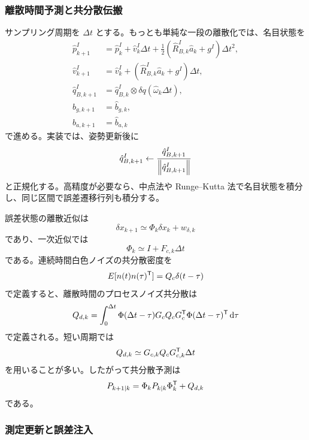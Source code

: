 \subsubsection{離散時間予測と共分散伝搬}

サンプリング周期を $\Delta t$ とする。もっとも単純な一段の離散化では、名目状態を
\begin{align}
  \hat{p}^I_{k+1}
  &=
  \hat{p}^I_k+\hat{v}^I_k\Delta t
  +\frac{1}{2}(\hat{R}^I_{B,k}\hat{a}_k+g^I)\Delta t^2,\\
  \hat{v}^I_{k+1}
  &=
  \hat{v}^I_k+(\hat{R}^I_{B,k}\hat{a}_k+g^I)\Delta t,\\
  \hat{q}^I_{B,k+1}
  &=
  \hat{q}^I_{B,k}\otimes\delta q(\hat{\omega}_k\Delta t),\\
  \hat{b}_{g,k+1}&=\hat{b}_{g,k},\\
  \hat{b}_{a,k+1}&=\hat{b}_{a,k}
\end{align}
で進める。実装では、姿勢更新後に
\begin{equation}
  \hat{q}^I_{B,k+1}
  \leftarrow
  \frac{\hat{q}^I_{B,k+1}}{\left\|\hat{q}^I_{B,k+1}\right\|}
\end{equation}
と正規化する。高精度が必要なら、中点法や Runge--Kutta 法で名目状態を積分し、同じ区間で誤差遷移行列も積分する。

誤差状態の離散近似は
\begin{equation}
  \delta x_{k+1}
  \simeq
  \Phi_k\delta x_k+w_{\delta,k}
\end{equation}
であり、一次近似では
\begin{equation}
  \Phi_k\simeq I+F_{c,k}\Delta t
\end{equation}
である。連続時間白色ノイズの共分散密度を
\begin{equation}
  E[n(t)n(\tau)^{\mathsf{T}}]=Q_c\delta(t-\tau)
\end{equation}
で定義すると、離散時間のプロセスノイズ共分散は
\begin{equation}
  Q_{d,k}
  =
  \int_0^{\Delta t}
  \Phi(\Delta t-\tau)G_cQ_cG_c^{\mathsf{T}}
  \Phi(\Delta t-\tau)^{\mathsf{T}}\,\mathrm{d}\tau
\end{equation}
で定義される。短い周期では
\begin{equation}
  Q_{d,k}\simeq G_{c,k}Q_cG_{c,k}^{\mathsf{T}}\Delta t
\end{equation}
を用いることが多い。したがって共分散予測は
\begin{equation}
  P_{k+1|k}
  =
  \Phi_kP_{k|k}\Phi_k^{\mathsf{T}}+Q_{d,k}
\end{equation}
である。

\subsubsection{測定更新と誤差注入}

